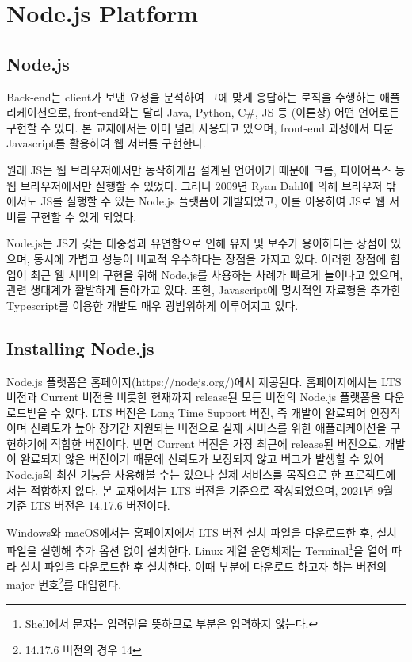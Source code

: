 \section{Node.js Platform}\label{sect:node-js-platform}

\subsection*{Node.js}

Back-end는 client가 보낸 요청을 분석하여 그에 맞게 응답하는 로직을 수행하는 애플리케이션으로, front-end와는 달리 Java, Python, C\#, JS 등 (이론상) 어떤 언어로든 구현할 수 있다. 본 교재에서는 이미 널리 사용되고 있으며, front-end 과정에서 다룬 Javascript를 활용하여 웹 서버를 구현한다.

원래 JS는 웹 브라우저에서만 동작하게끔 설계된 언어이기 때문에 크롬, 파이어폭스 등 웹 브라우저에서만 실행할 수 있었다. 그러나 2009년 Ryan Dahl에 의해 브라우저 밖에서도 JS를 실행할 수 있는 Node.js 플랫폼이 개발되었고, 이를 이용하여 JS로 웹 서버를 구현할 수 있게 되었다.

Node.js는 JS가 갖는 대중성과 유연함으로 인해 유지 및 보수가 용이하다는 장점이 있으며, 동시에 가볍고 성능이 비교적 우수하다는 장점을 가지고 있다. 이러한 장점에 힘입어 최근 웹 서버의 구현을 위해 Node.js를 사용하는 사례가 빠르게 늘어나고 있으며, 관련 생태계가 활발하게 돌아가고 있다. 또한, Javascript에 명시적인 자료형을 추가한 Typescript를 이용한 개발도 매우 광범위하게 이루어지고 있다.

\subsection*{Installing Node.js}

Node.js 플랫폼은 홈페이지(https://nodejs.org/)에서 제공된다. 홈페이지에서는 LTS 버전과 Current 버전을 비롯한 현재까지 release된 모든 버전의 Node.js 플랫폼을 다운로드받을 수 있다. LTS 버전은 Long Time Support 버전, 즉 개발이 완료되어 안정적이며 신뢰도가 높아 장기간 지원되는 버전으로 실제 서비스를 위한 애플리케이션을 구현하기에 적합한 버전이다. 반면 Current 버전은 가장 최근에 release된 버전으로, 개발이 완료되지 않은 버전이기 때문에 신뢰도가 보장되지 않고 버그가 발생할 수 있어 Node.js의 최신 기능을 사용해볼 수는 있으나 실제 서비스를 목적으로 한 프로젝트에서는 적합하지 않다. 본 교재에서는 LTS 버전을 기준으로 작성되었으며, 2021년 9월 기준 LTS 버전은 14.17.6 버전이다.

Windows와 macOS에서는 홈페이지에서 LTS 버전 설치 파일을 다운로드한 후, 설치 파일을 실행해 추가 옵션 없이 설치한다. Linux 계열 운영체제는 Terminal\footnote{Shell에서 \cd{\$} 문자는 입력란을 뜻하므로 \cd{\$ } 부분은 입력하지 않는다.}을 열어 \을 따라 설치 파일을 다운로드한 후 설치한다. 이때  부분에 다운로드 하고자 하는 버전의 major 번호\footnote{14.17.6 버전의 경우 14}를 대입한다.

